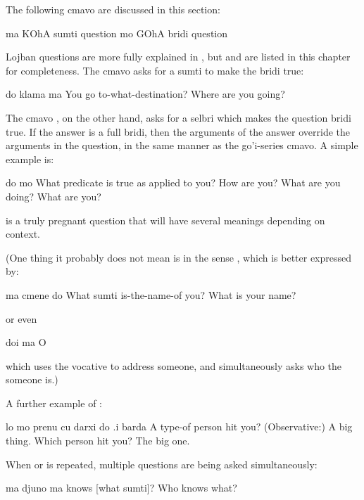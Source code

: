 The following cmavo are discussed in this section:

   ma  KOhA            sumti question
    mo  GOhA            bridi question

Lojban questions are more fully explained in , but  and  are
    listed in this chapter for completeness. The cmavo  asks
    for a sumti to make the bridi true:
\begin{example}
do klama ma\n
You go to-what-destination?\n
Where are you going?
\end{example}

The cmavo , on the other hand, asks for a selbri which
    makes the question bridi true. If the answer is a full bridi,
    then the arguments of the answer override the arguments in the
    question, in the same manner as the go'i-series cmavo. A simple
    example is:
\begin{example}
do mo\n
What predicate is true as applied to you?\n
How are you?\n
What are you doing?\n
What are you?
\end{example}

 is a truly pregnant question
    that will have several meanings depending on context. 

(One thing it probably does not mean is  in
    the sense , which is better
    expressed by:
\begin{example}
ma cmene do\n
What sumti is-the-name-of you?\n
What is your name?
\end{example}

{\noindent}or even
\begin{example}
doi ma\n
O 
\end{example}

{\noindent}which uses the vocative  to address someone, and
    simultaneously asks who the someone is.) 

A further example of :
\begin{example}
lo mo prenu cu darxi do\n
\T	.i barda\n
A  type-of person hit you?\n
\T	(Observative:) A big thing.\n
Which person hit you?  The big one.
\end{example}

When  or  is repeated, multiple questions are being
    asked simultaneously:
\begin{example}
ma djuno ma\n
{} knows [what sumti]?\n
Who knows what?
\end{example}



